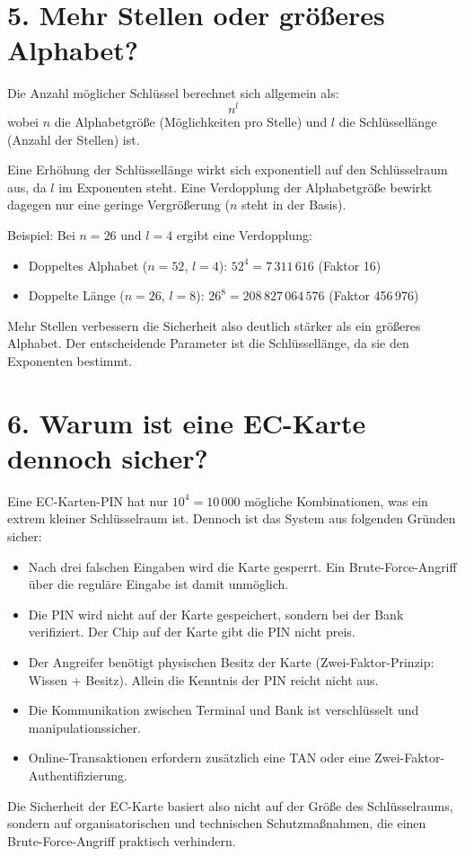 \documentclass[
	fontsize=12pt,          %
	paper=a4,               %
	numbers=noenddot,       %
	listof=totoc,           %
	listof=entryprefix,     %
	listof=nochaptergap,    %
	bibliography=totoc,     %
	parskip=half,           %
	openany                 %
]{scrbook}
\begin{document}
\section*{5. Mehr Stellen oder größeres Alphabet?}

Die Anzahl möglicher Schlüssel berechnet sich allgemein als:
\[
n^l
\]
wobei $n$ die Alphabetgröße (Möglichkeiten pro Stelle) und $l$ die Schlüssellänge (Anzahl der Stellen) ist.

Eine Erhöhung der Schlüssellänge wirkt sich exponentiell auf den Schlüsselraum aus, da $l$ im Exponenten steht.
Eine Verdopplung der Alphabetgröße bewirkt dagegen nur eine geringe Vergrößerung ($n$ steht in der Basis).

Beispiel: Bei $n=26$ und $l=4$ ergibt eine Verdopplung:
\begin{itemize}
	\item Doppeltes Alphabet ($n=52$, $l=4$): $52^4 = 7\,311\,616$ (Faktor 16)
	\item Doppelte Länge ($n=26$, $l=8$): $26^8 = 208\,827\,064\,576$ (Faktor 456\,976)
\end{itemize}

Mehr Stellen verbessern die Sicherheit also deutlich stärker als ein größeres Alphabet.
Der entscheidende Parameter ist die Schlüssellänge, da sie den Exponenten bestimmt.

\section*{6. Warum ist eine EC-Karte dennoch sicher?}

Eine EC-Karten-PIN hat nur $10^4 = 10\,000$ mögliche Kombinationen, was ein extrem kleiner Schlüsselraum ist.
Dennoch ist das System aus folgenden Gründen sicher:

\begin{itemize}
	\item Nach drei falschen Eingaben wird die Karte gesperrt.
	Ein Brute-Force-Angriff über die reguläre Eingabe ist damit unmöglich.
	\item Die PIN wird nicht auf der Karte gespeichert, sondern bei der Bank verifiziert.
	Der Chip auf der Karte gibt die PIN nicht preis.
	\item Der Angreifer benötigt physischen Besitz der Karte (Zwei-Faktor-Prinzip: Wissen + Besitz).
	Allein die Kenntnis der PIN reicht nicht aus.
	\item Die Kommunikation zwischen Terminal und Bank ist verschlüsselt und manipulationssicher.
	\item Online-Transaktionen erfordern zusätzlich eine TAN oder eine Zwei-Faktor-Authentifizierung.
\end{itemize}

Die Sicherheit der EC-Karte basiert also nicht auf der Größe des Schlüsselraums, sondern auf organisatorischen und technischen Schutzmaßnahmen, die einen Brute-Force-Angriff praktisch verhindern.


\end{document}
